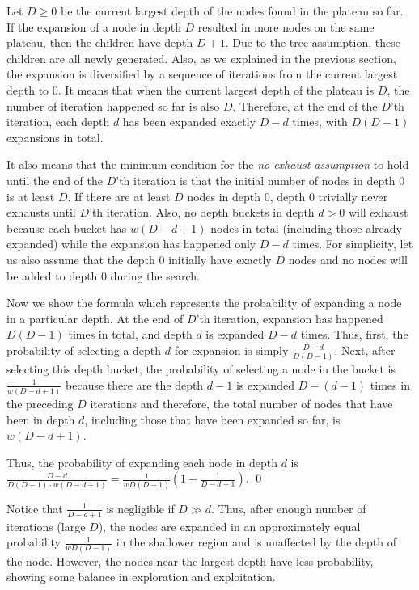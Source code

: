 Let $D\geq 0$ be the current largest depth of the nodes found in the plateau so far.  If the expansion of a node in
depth $D$ resulted in more nodes on the same plateau, then the children have depth $D+1$.  Due to the tree
assumption, these children are all newly generated. Also, as we explained in the previous section, the expansion is
diversified by a sequence of iterations from the current largest depth to 0.  It means that when the current
largest depth of the plateau is $D$, the number of iteration happened so far is also $D$.
Therefore, at the end of the $D$'th iteration, each depth $d$ has been expanded exactly $D-d$ times, with $D(D-1)$
expansions in total.

It also means that the minimum condition for the \emph{no-exhaust assumption} to hold until the end of the $D$'th
iteration is that the initial number of nodes in depth 0 is at least $D$.  If there are at least $D$ nodes in depth
0, depth 0 trivially never exhausts until $D$'th iteration. Also, no depth buckets in depth $d>0$ will exhaust
because each bucket has $w(D-d+1)$ nodes in total (including those already expanded) while the expansion has
happened only $D-d$ times. For simplicity, let us also assume that the depth 0 initially have exactly $D$ nodes and
no nodes will be added to depth 0 during the search.

Now we show the formula which represents the probability of expanding a node in a particular depth.
At the end of $D$'th iteration,
expansion has happened $D(D-1)$ times in total, and depth $d$ is expanded $D-d$ times.
Thus, first, the probability of selecting a depth $d$ for expansion is simply $\frac{D-d}{D(D-1)}$.
Next, after selecting this depth bucket, the probability of selecting a node in the bucket is $\frac{1}{w(D-d+1)}$ because there are 
the depth $d-1$ is expanded $D-(d-1)$ times in the preceding $D$ iterations
and therefore, the total number of nodes that have been in depth $d$, including those that have been expanded so far, is $w(D-d+1)$.


Thus, the probability of expanding each node in depth $d$ is
$\frac{D-d}{D(D-1)\cdot w(D-d+1)}=\frac{1}{wD(D-1)}(1-\frac{1}{D-d+1})$.  \qed

Notice that $\frac{1}{D-d+1}$ is negligible if $D \gg d$.
Thus, after enough number of iterations (large $D$), the nodes are 
expanded in an approximately equal probability $\frac{1}{wD(D-1)}$ in the shallower region and is
unaffected by the depth of the node.
However, the nodes near the largest depth have less probability, showing
some balance in exploration and exploitation.

